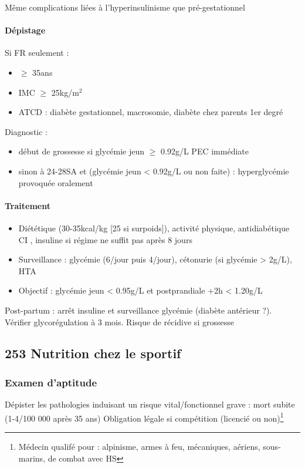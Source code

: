 \documentclass[11pt]{article}
\begin{document}
Même complications liées à l'hyperinsulinisme que pré-gestationnel

\paragraph{Dépistage}
\label{sec:org09d62a2}
Si FR seulement : 
\begin{itemize}
\item \(\ge\) 35ans
\item IMC \(\ge\) 25kg/m\(^{\text{2}}\)
\item ATCD : diabète gestationnel, macrosomie, diabète chez parents 1er degré
\end{itemize}
Diagnostic :
\begin{itemize}
\item début de grossesse si glycémie jeun \(\ge\) 0.92g/L \thus PEC immédiate
\item sinon à 24-28SA et (glycémie jeun < 0.92g/L ou non faite) : hyperglycémie
provoquée oralement
\end{itemize}

\paragraph{Traitement}
\label{sec:org31e732c}
\begin{itemize}
\item Diététique (30-35kcal/kg [25 si surpoids]), activité physique, antidiabétique
CI \faBomb, insuline si régime ne suffit pas après 8 jours
\item Surveillance : glycémie (6/jour puis 4/jour), cétonurie (si glycémie > 2g/L),
HTA
\item Objectif : glycémie jeun < 0.95g/L et postprandiale +2h < 1.20g/L
\end{itemize}

Post-partum : arrêt insuline et surveillance glycémie (diabète antérieur
?). Vérifier glycorégulation à 3 mois. Risque de récidive si grossesse
\subsection{253 \textdagger{} Nutrition chez le sportif}
\label{sec:org1c1e188}
\subsubsection{Examen d'aptitude}
\label{sec:orgfd2e14f}
Dépister les pathologies induisant un risque vital/fonctionnel grave : mort
subite (1-4/100 000 après 35 ans)
Obligation légale si compétition (licencié ou non)\footnote{Médecin qualifé pour : alpinisme, armes à feu, mécaniques, aériens, sous-marins, de combat
avec HS}
\end{document}
